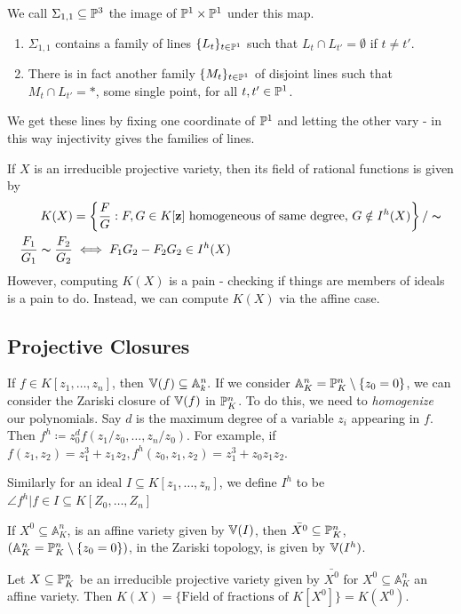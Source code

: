 \documentclass[10pt,a4paper,rgb]{article}
\newcommand{\A}{\mathbb{A}}
\begin{document}
We call $\Sigma_{1,1} \subseteq \P^3$ the image of $\P^1 \times \P^1$ under this map.
\begin{enumerate}
\item $\Sigma_{1,1}$ contains a family of lines $\{L_t\}_{t \in \P^1}$ such that $L_t \cap L_{t'} = \emptyset$ if $t \neq t'$.
\item There is in fact another family $\{M_t\}_{t \in \P^1}$ of disjoint lines such that $M_t \cap L_{t'} = \ast$, some single point, for all $t, t' \in \P^1$.
\end{enumerate}
We get these lines by fixing one coordinate of $\P^1$ and letting the other vary - in this way injectivity gives the families of lines.

If $X$ is an irreducible projective variety, then its field of rational functions is given by
\begin{align*}
K(X) &= \left\{ \frac{F}{G} : F, G \in K[\mathbf{z}] \text{ homogeneous of same degree, } G \notin I^h(X)\right\}/\thicksim\\
\frac{F_1}{G_1} \thicksim \frac{F_2}{G_2} & \iff F_1G_2 - F_2G_2 \in I^h(X)
\end{align*}
However, computing $K(X)$ is a pain - checking if things are members of ideals is a pain to do. Instead, we can compute $K(X)$ via the affine case.

\subsection{Projective Closures}
If $f \in K[z_1, \ldots, z_n]$, then $\V(f) \subseteq \A^n_k.$ If we consider $\A_K^n=\P_K^n\setminus \{z_0 =0\}$, we can consider the Zariski closure of $\V(f)$ in $\P^n_K$. To do this, we need to \emph{homogenize} our polynomials. Say $d$ is the maximum degree of a variable $z_i$ appearing in $f$. Then $f^h \coloneqq z_0^d f(z_1/z_0, \ldots, z_n/z_0)$. For example, if $f(z_1,z_2) = z_1^3 + z_1z_2, f^h(z_0,z_1,z_2) = z_1^3 + z_0z_1z_2$.

Similarly for an ideal $I \subseteq K[z_1, \ldots, z_n]$, we define $I^h$ to be $\angle{f^h | f \in I} \subseteq K[Z_0, \ldots, Z_n]$

\begin{lemma}
If $X^0 \subseteq \A^n_K$, is an affine variety given by $\V(I)$, then $\bar{X^0} \subseteq \P^n_K$, $(\A^n_K = \P^n_K \setminus \{z_0 = 0\})$, in the Zariski topology, is given by $\V(I^h)$.
\end{lemma}
\begin{proposition}
Let $X \subseteq \P^n_K$ be an irreducible projective variety given by $\bar{X^0}$ for $X^0 \subseteq \A^n_K$ an affine variety. Then $K(X) = \{\text{Field of fractions of }K[X^0]\} = K(X^0)$.
\end{proposition}
\end{document}
